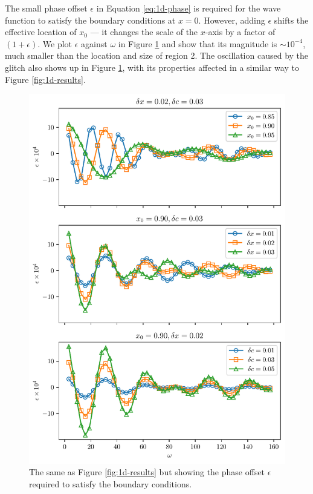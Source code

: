 
The small phase offset \(\epsilon\) in Equation \ref{eq:1d-phase} is required for the wave function to satisfy the boundary conditions at \(x = 0\). However, adding \(\epsilon\) shifts the effective location of \(x_0\) --- it changes the scale of the \(x\)-axis by a factor of \((1 + \epsilon)\). We plot \(\epsilon\) against \(\omega\) in Figure \ref{fig:1d-phase} and show that its magnitude is \(\sim 10^{-4}\), much smaller than the location and size of region 2. The oscillation caused by the glitch also shows up in Figure \ref{fig:1d-phase}, with its properties affected in a similar way to Figure \ref{fig:1d-results}.

\begin{figure}
    \centering
    \includegraphics{figures/glitch-1d-example-phase.pdf}
    \caption{The same as Figure \ref{fig:1d-results} but showing the phase offset \(\epsilon\) required to satisfy the boundary conditions.}
    \label{fig:1d-phase}
\end{figure}

